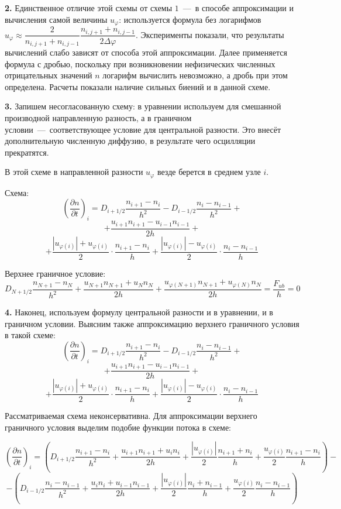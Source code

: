 \documentclass[2pt, a4paper, fleqn]{extarticle}
\begin{document}
{\bf 2.} Единственное отличие этой схемы от схемы $1$~---~в способе аппроксимации и вычисления самой величины $u_\varphi$: используется формула без логарифмов $u_\varphi \approx \dfrac{2}{n_{i, j+1}+n_{i, j-1}}\dfrac{n_{i, j+1}+n_{i, j-1}}{2\Delta\varphi}$. Эксперименты показали, что результаты вычислений слабо зависят от способа этой аппроксимации. Далее применяется формула с дробью, поскольку при возникновении нефизических численных отрицательных значений $n$ логарифм вычислить невозможно, а дробь при этом определена. Расчеты показали наличие сильных биений и в данной схеме.

\medskip

{\bf 3.} Запишем несогласованную схему: в уравнении используем для смешанной производной направленную разность, а в граничном условии~---~соответствующее условие для центральной разности. Это внесёт дополнительную численную диффузию, в результате чего осцилляции прекратятся.

В этой схеме в направленной разности $u_\varphi$ везде берется в среднем узле $i$.

Схема: $$\left(\dfrac{\partial n}{\partial t}\right)_i = D_{i+1/2}\dfrac{n_{i+1}-n_i}{h^2} - D_{i-1/2}\dfrac{n_{i}-n_{i-1}}{h^2}+$$ $$+\dfrac{u_{i+1}n_{i+1}-u_{i-1}n_{i-1}}{2h} + $$ $$+\dfrac{|u_{\varphi(i)}|+u_{\varphi(i)}}{2}\cdot\dfrac{n_{i+1}-n_i}{h}+\dfrac{|u_{\varphi(i)}|-u_{\varphi(i)}}{2}\cdot\dfrac{n_i-n_{i-1}}{h}$$

Верхнее граничное условие: $$D_{N+1/2}\dfrac{n_{N+1}-n_{N}}{h^2}+\dfrac{u_{N+1}n_{N+1}+u_{N}n_{N}}{2h}+\dfrac{u_{\varphi(N+1)}n_{N+1}+u_{\varphi(N)}n_{N}}{2h} = \dfrac{F_{ub}}{h} = 0$$

\medskip

{\bf 4.} Наконец, используем формулу центральной разности и в уравнении, и в граничном условии. Выясним также аппроксимацию верхнего граничного условия в такой схеме: $$\left(\dfrac{\partial n}{\partial t}\right)_i = D_{i+1/2}\dfrac{n_{i+1}-n_i}{h^2} - D_{i-1/2}\dfrac{n_{i}-n_{i-1}}{h^2}+$$ $$+\dfrac{u_{i+1}n_{i+1}-u_{i-1}n_{i-1}}{2h} + $$ $$+\dfrac{|u_{\varphi(i)}|+u_{\varphi(i)}}{2}\cdot\dfrac{n_{i+1}-n_i}{h}+\dfrac{|u_{\varphi(i)}|-u_{\varphi(i)}}{2}\cdot\dfrac{n_i-n_{i-1}}{h}$$

Рассматриваемая схема неконсервативна. Для аппроксимации верхнего граничного условия выделим подобие функции потока в схеме:

$$\left(\dfrac{\partial n}{\partial t}\right)_i = \left(D_{i+1/2}\dfrac{n_{i+1}-n_i}{h^2} + \dfrac{u_{i+1}n_{i+1}+u_in_i}{2h}+\dfrac{|u_{\varphi(i)}|}{2}\dfrac{n_{i+1}+n_{i}}{h}+\dfrac{u_{\varphi(i)}}{2}\dfrac{n_{i+1}-n_i}{h}\right) - $$ $$ - \left(D_{i-1/2}\dfrac{n_{i}-n_{i-1}}{h^2} + \dfrac{u_{i}n_{i}+u_{i-1}n_{i-1}}{2h}+\dfrac{|u_{\varphi(i)}|}{2}\dfrac{n_{i}+n_{i-1}}{h}+\dfrac{u_{\varphi(i)}}{2}\dfrac{n_{i}-n_{i-1}}{h}\right)$$
\end{document}
